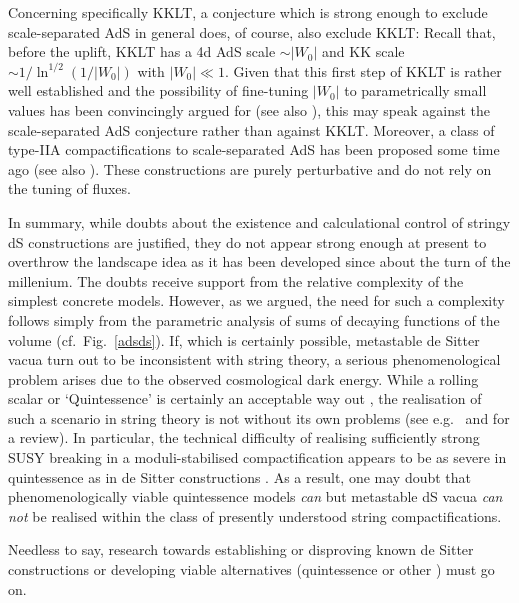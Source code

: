 \documentclass[12pt]{article}
\numberwithin{equation}{section}
\begin{document}
Concerning specifically KKLT, a conjecture which is strong enough to exclude scale-separated AdS in general does, of course, also exclude KKLT: Recall that, before the uplift, KKLT has a 4d AdS scale $\sim |W_0|$ and KK scale $\sim 1/\ln^{1/2}(1/|W_0|)$ with $|W_0|\ll 1$. Given that this first step of KKLT is rather well established and the possibility of fine-tuning $|W_0|$ to parametrically small values has been convincingly argued for \cite{Denef:2004ze} (see also \cite{Demirtas:2019sip}), this may speak against the scale-separated AdS conjecture rather than against KKLT. Moreover, a class of type-IIA compactifications to scale-separated AdS has been proposed some time ago \cite{DeWolfe:2005uu} (see also \cite{Marchesano:2020qvg, Junghans:2020acz}). These constructions are purely perturbative and do not rely on the tuning of fluxes.

In summary, while doubts about the existence and calculational control of stringy dS constructions are justified, they do not appear strong enough at present to overthrow the landscape idea as it has been developed since about the turn of the millenium. The doubts receive support from the relative complexity of the simplest concrete models. However, as we argued, the need for such a complexity follows simply from the parametric analysis of sums of decaying functions of the volume (cf.~Fig.~\ref{adsds}). If, which is certainly possible, metastable de Sitter vacua turn out to be inconsistent with string theory, a serious phenomenological problem arises due to the observed cosmological dark energy. While a rolling scalar or `Quintessence' \cite{Wetterich:1987fm, Peebles:1987ek} is certainly an acceptable way out \cite{Obied:2018sgi}, the realisation of such a scenario in string theory is not without its own problems (see e.g.~\cite{Cicoli:2012tz} and \cite{Cicoli:2018kdo} for a review). In particular, the technical difficulty of realising sufficiently strong SUSY breaking in a moduli-stabilised compactification appears to be as severe in quintessence as in de Sitter constructions \cite{Hebecker:2019csg}. 
As a result, one may doubt that phenomenologically viable quintessence models {\it can} but metastable dS vacua {\it can not} be realised within the class of presently understood string compactifications. 

Needless to say, research towards establishing or disproving known de Sitter constructions or developing viable alternatives (quintessence or other \cite{Hardy:2019apu}) must go on.
\end{document}
